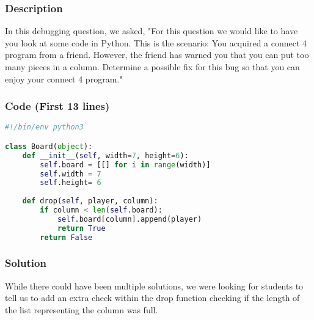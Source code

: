 \documentclass{article}
\begin{document}
\subsubsection{Description}
In this debugging question, we asked, "For this question we would like to have you look at some code in Python. This is the scenario: You acquired a connect 4 program from a friend. However, the friend has warned you that you can put too many pieces in a column. Determine a possible fix for this bug so that you can enjoy your connect 4 program."
\subsubsection{Code (First 13 lines)}
\begin{lstlisting}[language=python]
#!/bin/env python3

class Board(object):
	def __init__(self, width=7, height=6):
		self.board = [[] for i in range(width)]
		self.width = 7
		self.height= 6
	
	def drop(self, player, column):
		if column < len(self.board):
			self.board[column].append(player)
			return True
		return False
\end{lstlisting}
\subsubsection{Solution}
While there could have been multiple solutions, we were looking for students to tell us to add an extra check within the drop function checking if the length of the list representing the column was full.
\end{document}
